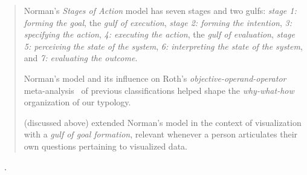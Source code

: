 \begin{quotation}
    Norman's {\it Stages of Action} model has seven stages and two gulfs: {\it stage 1: forming the goal}, the {\it gulf of execution}, {\it stage 2: forming the intention}, {\it 3: specifying the action}, {\it 4: executing the action}, the {\it gulf of evaluation}, {\it stage 5: perceiving the state of the system}, {\it 6: interpreting the state of the system}, and {\it 7: evaluating the outcome}. 

    \begin{sloppypar}
    Norman's model and its influence on Roth's {\it objective-operand-operator} meta-analysis~\cite{Roth2012a} of previous classifications helped shape the {\it why-what-how} organization of our typology.
    \end{sloppypar}
    
    \citet{Lam2008} (discussed above) extended Norman's model in the context of visualization with a {\it gulf of goal formation}, relevant whenever a person articulates their own questions pertaining to visualized data.
\end{quotation}

\begin{sloppypar}
~\cite{Roth2012}. \end{sloppypar}

